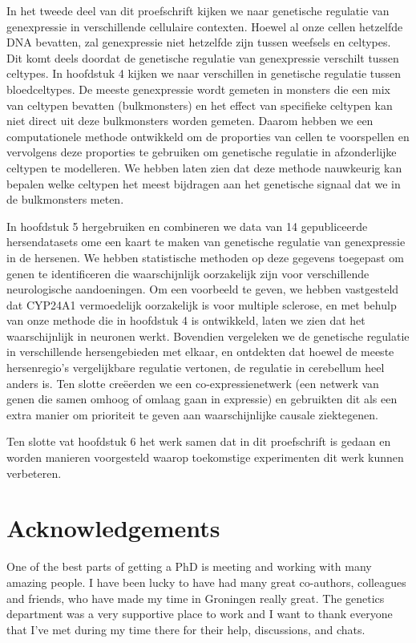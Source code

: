 \begin{appendices}
In het tweede deel van dit proefschrift kijken we naar genetische regulatie van genexpressie in verschillende cellulaire contexten. Hoewel al onze cellen hetzelfde DNA bevatten, zal genexpressie niet hetzelfde zijn tussen weefsels en celtypes. Dit komt deels doordat de genetische regulatie van genexpressie verschilt tussen celtypes. In hoofdstuk 4 kijken we naar verschillen in genetische regulatie tussen bloedceltypes. De meeste genexpressie wordt gemeten in monsters die een mix van celtypen bevatten (bulkmonsters) en het effect van specifieke celtypen kan niet direct uit deze bulkmonsters worden gemeten. Daarom hebben we een computationele methode ontwikkeld om de proporties van cellen te voorspellen en vervolgens deze proporties te gebruiken om genetische regulatie in afzonderlijke celtypen te modelleren. We hebben laten zien dat deze methode nauwkeurig kan bepalen welke celtypen het meest bijdragen aan het genetische signaal dat we in de bulkmonsters meten.

In hoofdstuk 5 hergebruiken en combineren we data van 14 gepubliceerde hersendatasets ome een kaart te maken van genetische regulatie van genexpressie in de hersenen. We hebben statistische methoden op deze gegevens toegepast om genen te identificeren die waarschijnlijk oorzakelijk zijn voor verschillende neurologische aandoeningen. Om een voorbeeld te geven, we hebben vastgesteld dat CYP24A1 vermoedelijk oorzakelijk is voor multiple sclerose, en met behulp van onze methode die in hoofdstuk 4 is ontwikkeld, laten we zien dat het waarschijnlijk in neuronen werkt. Bovendien vergeleken we de genetische regulatie in verschillende hersengebieden met elkaar, en ontdekten dat hoewel de meeste hersenregio's vergelijkbare regulatie vertonen, de regulatie in cerebellum heel anders is. Ten slotte creëerden we een co-expressienetwerk (een netwerk van genen die samen omhoog of omlaag gaan in expressie) en gebruikten dit als een extra manier om prioriteit te geven aan waarschijnlijke causale ziektegenen.

Ten slotte vat hoofdstuk 6 het werk samen dat in dit proefschrift is gedaan en worden manieren voorgesteld waarop toekomstige experimenten dit werk kunnen verbeteren.

\chapter{Acknowledgements}

One of the best parts of getting a PhD is meeting and working with many amazing people. I have been lucky to have had many great co-authors, colleagues and friends, who have made my time in Groningen really great. The genetics department was a very supportive place to work and I want to thank everyone that I've met during my time there for their help, discussions, and chats.


\end{appendices}
